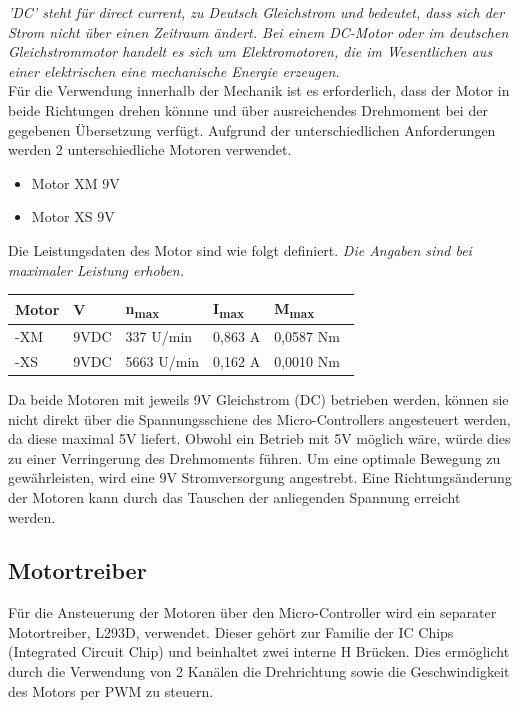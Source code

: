 \documentclass[conference,compsoc,final,a4paper]{IEEEtran}
\begin{document}
\textit{’DC’ steht für direct current, zu Deutsch Gleichstrom und bedeutet, dass sich der Strom nicht über einen Zeitraum ändert. Bei einem DC-Motor oder im deutschen Gleichstrommotor handelt es sich um Elektromotoren, die im Wesentlichen aus
einer elektrischen eine mechanische Energie erzeugen.} \autocite{metzgerkonzepte}
\\


\noindent Für die Verwendung innerhalb der Mechanik ist es erforderlich, dass der Motor in beide Richtungen drehen könnne und über ausreichendes Drehmoment bei der gegebenen Übersetzung verfügt.
Aufgrund der unterschiedlichen Anforderungen werden 2 unterschiedliche Motoren verwendet.
\begin{itemize}
\item Motor XM 9V
\item Motor XS 9V
\end{itemize}

\noindent Die Leistungsdaten des Motor sind wie folgt definiert. 
\newline \textit{Die Angaben sind bei maximaler Leistung erhoben.}

\begin{table}[h]\begin{tabular}{lllll}
    \textbf{Motor} & \textbf{V} & \textbf{n\textsubscript{max}} & \textbf{I\textsubscript{max}} & \textbf{M\textsubscript{max}} \\ \hline
  -XM\autocite{motorenXM} & 9VDC & 337 U/min  & 0,863 A & 0,0587 Nm  \\ 
  -XS\autocite{motorenXS} & 9VDC & 5663 U/min & 0,162 A & 0,0010 Nm  \\
\end{tabular}\end{table}

\noindent Da beide Motoren mit jeweils 9V Gleichstrom (DC) betrieben werden, können sie nicht direkt über die Spannungsschiene des Micro-Controllers angesteuert werden, 
da diese maximal 5V liefert. Obwohl ein Betrieb mit 5V möglich wäre, würde dies zu einer Verringerung des Drehmoments führen. Um eine optimale Bewegung zu gewährleisten, 
wird eine 9V Stromversorgung angestrebt.  Eine Richtungsänderung der Motoren kann durch das Tauschen der anliegenden Spannung erreicht werden.  

\subsection{Motortreiber}

Für die Ansteuerung der Motoren über den Micro-Controller wird ein separater Motortreiber, L293D, verwendet.
Dieser gehört zur Familie der IC Chips (Integrated Circuit Chip) und beinhaltet zwei interne H Brücken. Dies ermöglicht durch die Verwendung von 2 Kanälen die Drehrichtung 
sowie die Geschwindigkeit des Motors per PWM zu steuern.
\end{document}
